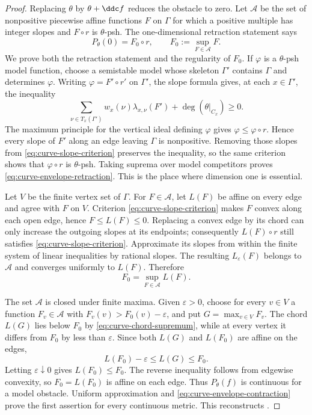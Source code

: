 \begin{proof}
Replacing $\theta$ by $\theta+\ddc f$ reduces the obstacle to zero.  Let
$\mathcal A$ be the set of nonpositive piecewise affine functions $F$ on
$\Gamma$ for which a positive multiple has integer slopes and
$F\circ r$ is $\theta$-psh.  The one-dimensional retraction statement says
\begin{equation}\label{eq:curve-envelope-retraction}
 P_\theta(0)=F_0\circ r,
 \qquad F_0:=\sup_{F\in\mathcal A}F.
\end{equation}
We prove both the retraction statement and the regularity of $F_0$.
If $\varphi$ is a $\theta$-psh model function, choose a semistable model
whose skeleton $\Gamma'$ contains $\Gamma$ and determines $\varphi$.
Writing $\varphi=F'\circ r'$ on $\Gamma'$, the slope formula gives, at
each $x\in\Gamma'$, the inequality
\begin{equation}\label{eq:curve-slope-criterion}
 \sum_{\nu\in T_x(\Gamma')}
   w_x(\nu)\lambda_{x,\nu}(F')+\deg(\theta|_{C_x})\geq0.
\end{equation}
The maximum principle for the vertical ideal defining $\varphi$ gives
$\varphi\leq\varphi\circ r$.  Hence every slope of $F'$ along an edge
leaving $\Gamma$ is nonpositive.  Removing those slopes from
\eqref{eq:curve-slope-criterion} preserves the inequality, so the same
criterion shows that $\varphi\circ r$ is $\theta$-psh.  Taking suprema
over model competitors proves \eqref{eq:curve-envelope-retraction}.  This
is the place where dimension one is essential.

Let $V$ be the finite vertex set of $\Gamma$.  For
$F\in\mathcal A$, let $L(F)$ be affine on every edge and agree with $F$ on
$V$.  Criterion \eqref{eq:curve-slope-criterion} makes $F$ convex along
each open edge, hence $F\leq L(F)\leq0$.  Replacing a convex edge by its
chord can only increase the outgoing slopes at its endpoints; consequently
$L(F)\circ r$ still satisfies
\eqref{eq:curve-slope-criterion}.  Approximate its slopes from within the
finite system of linear inequalities by rational slopes.  The resulting
$L_\varepsilon(F)$ belongs to $\mathcal A$ and converges uniformly to
$L(F)$.  Therefore
\begin{equation}\label{eq:curve-chord-supremum}
                 F_0=\sup_{F\in\mathcal A}L(F).
\end{equation}

The set $\mathcal A$ is closed under finite maxima.  Given
$\varepsilon>0$, choose for every $v\in V$ a function $F_v\in\mathcal A$
with $F_v(v)>F_0(v)-\varepsilon$, and put $G=\max_{v\in V}F_v$.  The chord
$L(G)$ lies below $F_0$ by
\eqref{eq:curve-chord-supremum}, while at every vertex it differs from
$F_0$ by less than $\varepsilon$.  Since both $L(G)$ and $L(F_0)$ are
affine on the edges,
\[
                 L(F_0)-\varepsilon\leq L(G)\leq F_0.
\]
Letting $\varepsilon\downarrow0$ gives $L(F_0)\leq F_0$.  The reverse
inequality follows from edgewise convexity, so $F_0=L(F_0)$ is affine on
each edge.  Thus $P_\theta(f)$ is continuous for a model obstacle.  Uniform
approximation and \eqref{eq:curve-envelope-contraction} prove the first
assertion for every continuous metric.  This reconstructs
\cite[Theorem~3.1 and Propositions~3.5, 3.7, 3.8 and 3.10]{GJKM19}.


\end{proof}
